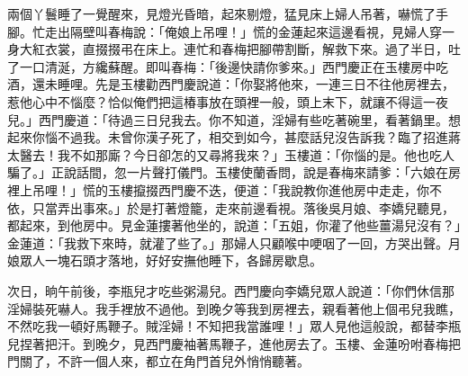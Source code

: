 兩個丫鬟睡了一覺醒來，見燈光昏暗，起來剔燈，猛見床上婦人吊著，嚇慌了手腳。忙走出隔壁叫春梅說：「俺娘上吊哩！」慌的金蓮起來這邊看視，見婦人穿一身大紅衣裳，直掇掇弔在床上。連忙和春梅把腳帶割斷，解救下來。過了半日，吐了一口清涎，方纔蘇醒。即叫春梅：「後邊快請你爹來。」西門慶正在玉樓房中吃酒，還未睡哩。先是玉樓勸西門慶說道：「你娶將他來，一連三日不往他房裡去，惹他心中不惱麼？恰似俺們把這椿事放在頭裡一般，頭上末下，就讓不得這一夜兒。」西門慶道：「待過三日兒我去。你不知道，淫婦有些吃著碗里，看著鍋里。想起來你惱不過我。未曾你漢子死了，相交到如今，甚麼話兒沒告訴我？臨了招進蔣太醫去！我不如那廝？今日卻怎的又尋將我來？」玉樓道：「你惱的是。他也吃人騙了。」正說話間，忽一片聲打儀門。玉樓使蘭香問，說是春梅來請爹：「六娘在房裡上吊哩！」慌的玉樓攛掇西門慶不迭，便道：「我說教你進他房中走走，你不依，只當弄出事來。」於是打著燈籠，走來前邊看視。落後吳月娘、李嬌兒聽見，都起來，到他房中。見金蓮摟著他坐的，說道：「五姐，你灌了他些薑湯兒沒有？」金蓮道：「我救下來時，就灌了些了。」那婦人只顧喉中哽咽了一回，方哭出聲。月娘眾人一塊石頭才落地，好好安撫他睡下，各歸房歇息。

次日，晌午前後，李瓶兒才吃些粥湯兒。西門慶向李嬌兒眾人說道：「你們休信那淫婦裝死嚇人。我手裡放不過他。到晚夕等我到房裡去，親看著他上個弔兒我瞧，不然吃我一頓好馬鞭子。賊淫婦！不知把我當誰哩！」眾人見他這般說，都替李瓶兒捏著把汗。到晚夕，見西門慶袖著馬鞭子，進他房去了。玉樓、金蓮吩咐春梅把門關了，不許一個人來，都立在角門首兒外悄悄聽著。

